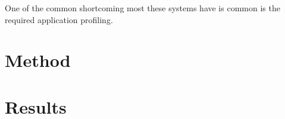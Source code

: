 One of the common shortcoming most these systems have is common is the required application profiling.


\cite{Jeannot2014ProcPlacementInMulticoreClusters}


\cite{Mercer2011ImprvMPIWithRR} \cite{Gropp2019CartTopoMapping}



\section{Method}
\section{Results}
